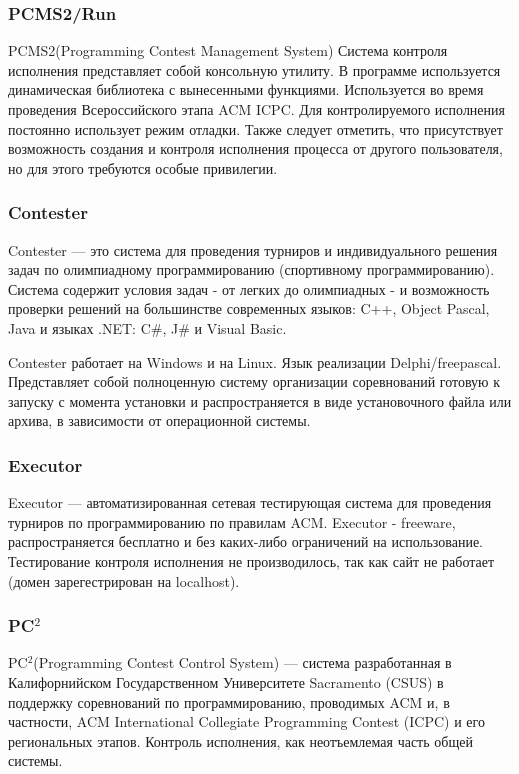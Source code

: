 \documentclass{imcs}
\begin{document}
\subsubsection{PCMS2/Run}
PCMS2(Programming Contest Management System)\cite{pcms2}
Система контроля исполнения представляет собой консольную утилиту. В программе используется динамическая библиотека с вынесенными функциями.
Используется во время проведения Всероссийского этапа ACM ICPC.
Для контролируемого исполнения постоянно использует режим отладки.
Также следует отметить, что присутствует возможность создания и контроля исполнения процесса от другого пользователя, но для этого требуются особые привилегии.
\subsubsection{Contester}
Contester\cite{contester} --- это система для проведения турниров и индивидуального решения задач по олимпиадному программированию (спортивному программированию). Система содержит условия задач - от легких до олимпиадных - и возможность проверки решений на большинстве современных языков: C++, Object Pascal, Java и языках .NET: C\#, J\# и Visual Basic.

Contester работает на Windows и на Linux. Язык реализации Delphi/freepascal. Представляет собой полноценную систему организации соревнований готовую к запуску с момента установки и распространяется в виде установочного файла или архива, в зависимости от операционной системы.
\subsubsection{Executor}
Executor\cite{executor} --- автоматизированная сетевая тестирующая система для проведения турниров по программированию по правилам ACM. Executor - freeware, распространяется бесплатно и без каких-либо ограничений на использование.
Тестирование контроля исполнения не производилось, так как сайт не работает (домен зарегестрирован на localhost).
\subsubsection{PC$^2$}
PC$^2$(Programming Contest Control System)\cite{pccs} --- система разработанная в Калифорнийском Государственном Университете Sacramento (CSUS) в поддержку соревнований по программированию, проводимых ACM и, в частности, ACM International Collegiate Programming Contest (ICPC) и его региональных этапов. 
Контроль исполнения, как неотъемлемая часть общей системы.
\end{document}
